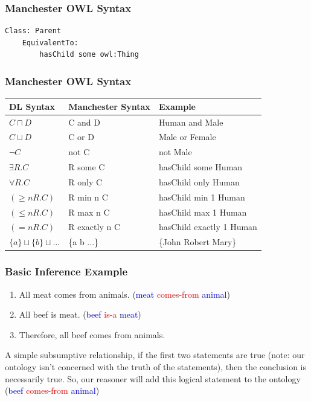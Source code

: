 \documentclass{beamer}
\begin{document}
\begin{frame}[fragile]
  \frametitle{Manchester OWL Syntax}
{\tiny
\begin{verbatim}
Class: Parent
    EquivalentTo: 
        hasChild some owl:Thing
\end{verbatim}
}
\end{frame}

\begin{frame}
  \frametitle{Manchester OWL Syntax}
  \begin{table}[ht]
    \centering
    \begin{tabular}{|l|l|l|}
      DL Syntax & Manchester Syntax & Example \\
      \hline
      $C \sqcap D$ & C and D & Human and Male \\
      $C \sqcup D$ & C or D & Male or Female \\
      $\neg C$ & not C & not Male \\
      $\exists R.C$ & R some C & hasChild some Human \\
      $\forall R.C$ & R only C & hasChild only Human \\
      $(\geq n R.C)$ & R min n C & hasChild min 1 Human \\
      $(\leq n R.C)$ & R max n C & hasChild max 1 Human \\
      $(= n R.C)$ & R exactly n C & hasChild exactly 1 Human \\
      $\{a\} \sqcup \{b\} \sqcup ...$ & \{a b ...\} & \{John Robert
                                                      Mary\} \\
      \hline
    \end{tabular}
  \end{table}
\end{frame}


\begin{frame}
\frametitle{Basic Inference Example}

\begin{enumerate}
  \item All meat comes from animals. (\textcolor{blue}{meat}
  \textcolor{red}{comes-from} \textcolor{blue}{animal})
  \item All beef is meat. (\textcolor{blue}{beef} \textcolor{red}{is-a}
  \textcolor{blue}{meat})
  \item Therefore, all beef comes from animals.
\end{enumerate}
A simple subsumptive relationship, if the first two statements are true (note: our
ontology isn't concerned with the truth of the statements), then the conclusion
is necessarily true. So, our reasoner will add this logical statement to the
ontology (\textcolor{blue}{beef} \textcolor{red}{comes-from} \textcolor{blue}{animal})
\end{frame}
\end{document}
